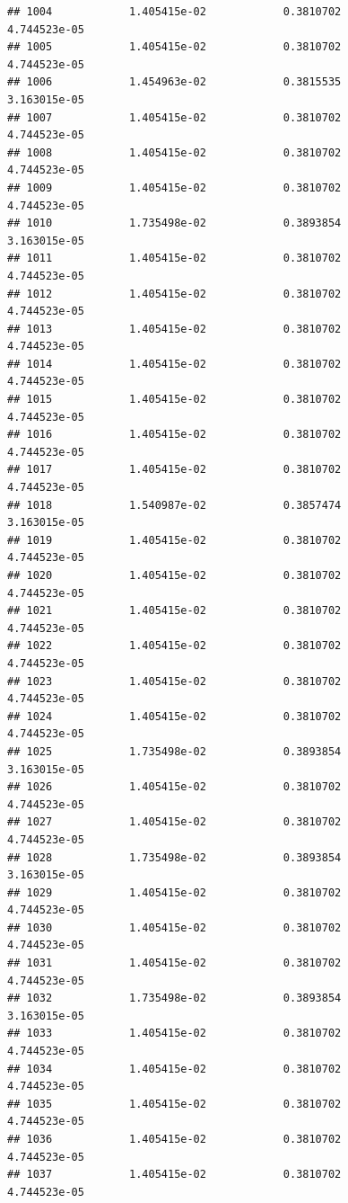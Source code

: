 \documentclass[
]{article}
\begin{document}
\begin{verbatim}
## 1004            1.405415e-02            0.3810702            4.744523e-05
## 1005            1.405415e-02            0.3810702            4.744523e-05
## 1006            1.454963e-02            0.3815535            3.163015e-05
## 1007            1.405415e-02            0.3810702            4.744523e-05
## 1008            1.405415e-02            0.3810702            4.744523e-05
## 1009            1.405415e-02            0.3810702            4.744523e-05
## 1010            1.735498e-02            0.3893854            3.163015e-05
## 1011            1.405415e-02            0.3810702            4.744523e-05
## 1012            1.405415e-02            0.3810702            4.744523e-05
## 1013            1.405415e-02            0.3810702            4.744523e-05
## 1014            1.405415e-02            0.3810702            4.744523e-05
## 1015            1.405415e-02            0.3810702            4.744523e-05
## 1016            1.405415e-02            0.3810702            4.744523e-05
## 1017            1.405415e-02            0.3810702            4.744523e-05
## 1018            1.540987e-02            0.3857474            3.163015e-05
## 1019            1.405415e-02            0.3810702            4.744523e-05
## 1020            1.405415e-02            0.3810702            4.744523e-05
## 1021            1.405415e-02            0.3810702            4.744523e-05
## 1022            1.405415e-02            0.3810702            4.744523e-05
## 1023            1.405415e-02            0.3810702            4.744523e-05
## 1024            1.405415e-02            0.3810702            4.744523e-05
## 1025            1.735498e-02            0.3893854            3.163015e-05
## 1026            1.405415e-02            0.3810702            4.744523e-05
## 1027            1.405415e-02            0.3810702            4.744523e-05
## 1028            1.735498e-02            0.3893854            3.163015e-05
## 1029            1.405415e-02            0.3810702            4.744523e-05
## 1030            1.405415e-02            0.3810702            4.744523e-05
## 1031            1.405415e-02            0.3810702            4.744523e-05
## 1032            1.735498e-02            0.3893854            3.163015e-05
## 1033            1.405415e-02            0.3810702            4.744523e-05
## 1034            1.405415e-02            0.3810702            4.744523e-05
## 1035            1.405415e-02            0.3810702            4.744523e-05
## 1036            1.405415e-02            0.3810702            4.744523e-05
## 1037            1.405415e-02            0.3810702            4.744523e-05

\end{verbatim}
\end{document}
